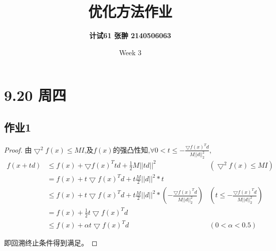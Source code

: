 \documentclass[UTF8]{ctexart}
\title{\Large \textbf{优化方法作业}}
\author{\textbf{计试61 张翀 2140506063}}
\date{Week 3}
\theoremstyle{Defination}
\theoremstyle{remark}
\begin{document}
\maketitle



\section*{9.20 周四}

\subsection*{作业1}

\begin{proof}
由$\bigtriangledown^2f(x)\leq MI$,及$f(x)$的强凸性知,$\forall0<t\leq-\frac{\bigtriangledown f(x)^Td}{M||d||_2^2}$,
\begin{align*}
f(x+td) & \leq f(x)+\bigtriangledown f(x)^Ttd+\frac{1}{2}M||td||^2 & (\bigtriangledown^2f(x)\leq MI) \\
 & =f(x)+t\bigtriangledown f(x)^Td+t\frac{M}{2}||d||^2*t \\
 & \leq f(x)+t\bigtriangledown f(x)^Td+t\frac{M}{2}||d||^2*(-\frac{\bigtriangledown f(x)^Td}{M||d||_2^2}) & (t\leq-\frac{\bigtriangledown f(x)^Td}{M||d||_2^2}) \\
 & =f(x)+\frac{1}{2}t\bigtriangledown f(x)^Td \\
 & \leq f(x)+\alpha t\bigtriangledown f(x)^Td & (0<\alpha<0.5)
\end{align*}

即回溯终止条件得到满足。
\end{proof}



\end{document}
